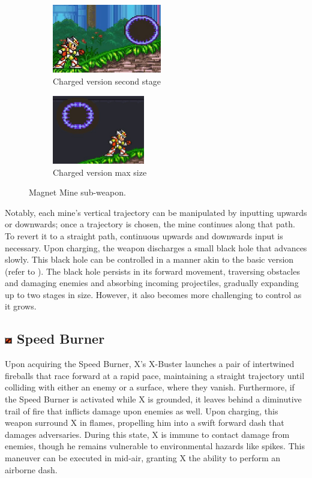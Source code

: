 \begin{figure}[htp]
	\ContinuedFloat
	\centering
	\begin{subfigure}{0.4\linewidth}
		\centering
		\includegraphics[height=3cm]{figures/X2/weapons/M_mine_5.png}	
		\caption{Charged version second stage}
	\end{subfigure}
	\begin{subfigure}{0.4\linewidth}
		\centering
		\includegraphics[height=3cm]{figures/X2/weapons/M_mine_6.png}	
		\caption{Charged version max size}
	\end{subfigure}
	\caption{Magnet Mine sub-weapon.}
\end{figure}
 Notably, each mine's vertical trajectory can be manipulated by inputting upwards or downwards; once a trajectory is chosen, the mine continues along that path. To revert it to a straight path, continuous upwards and downwards input is necessary. Upon charging, the weapon discharges a small black hole that advances slowly. This black hole can be controlled in a manner akin to the basic version (refer to ). The black hole persists in its forward movement, traversing obstacles and damaging enemies and absorbing incoming projectiles, gradually expanding up to two stages in size. However, it also becomes more challenging to control as it grows.


\subsection{\includegraphics[width=12px, height=10px]{figures/X2/weapons/S_burner.png} Speed Burner}\label{Speed_burner}
Upon acquiring the Speed Burner, X's X-Buster launches a pair of intertwined fireballs that race forward at a rapid pace, maintaining a straight trajectory until colliding with either an enemy or a surface, where they vanish. Furthermore, if the Speed Burner is activated while X is grounded, it leaves behind a diminutive trail of fire that inflicts damage upon enemies as well. Upon charging, this weapon surround X in flames, propelling him into a swift forward dash that damages adversaries. During this state, X is immune to contact damage from enemies, though he remains vulnerable to environmental hazards like spikes. This maneuver can be executed in mid-air, granting X the ability to perform an airborne dash.

